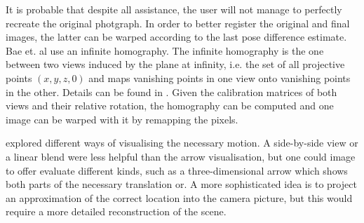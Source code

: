 It is probable that despite all assistance, the user will not manage to
perfectly recreate the original photgraph.  In order to better register the
original and final images, the latter can be warped according to the last pose
difference estimate. Bae et. al use an infinite homography. The infinite
homography is the one between two views induced by the plane at infinity, i.e.
the set of all projective points $(x,y,z,0)$ and maps vanishing points in one
view onto vanishing points in the other. Details can be found in \citep[ch. 13.4]{h&z2004}.
Given the calibration matrices of both views and their relative
rotation, the homography can be computed and one image can be warped with it
by remapping the pixels.

\citet{bae2010} explored different ways of visualising the necessary motion.
A side-by-side view or a linear blend were less helpful than the arrow
visualisation, but one could image to offer evaluate different kinds, such as
a three-dimensional arrow which shows both parts of the necessary translation
or. A more sophisticated idea is to project an approximation of the correct
location into the camera picture, but this would require a more detailed
reconstruction of the scene.

